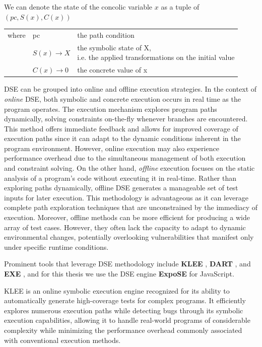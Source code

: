 We can denote the state of the concolic variable $x$ as a tuple of $(pc, S(x), C(x))$


\capstartfalse
{\centering
    \begin{table}[ht]
        \begin{tabular}{lll}
            where & pc & the path condition \\
             & $S(x) \rightarrow X$& \specialcell[c]{the symbolic state of X,\\ i.e. the applied transformations on the initial value}\\
             & $C(x) \rightarrow 0$& the concrete value of x\\
        \end{tabular}
    \end{table}
\par} 
\capstarttrue

DSE can be grouped into online and offline execution strategies. 
In the context of \textit{online} DSE, both symbolic and concrete execution occurs in real time as the program operates. 
The execution mechanism explores program paths dynamically, solving constraints on-the-fly whenever branches are encountered. 
This method offers immediate feedback and allows for improved coverage of execution paths since it can adapt to the dynamic conditions inherent in the program environment. 
However, online execution may also experience performance overhead due to the simultaneous management of both execution and constraint solving. 
On the other hand, \textit{offline} execution focuses on the static analysis of a program’s code without executing it in real-time. 
Rather than exploring paths dynamically, offline DSE generates a manageable set of test inputs for later execution. 
This methodology is advantageous as it can leverage complete path exploration techniques that are unconstrained by the immediacy of execution. 
Moreover, offline methods can be more efficient for producing a wide array of test cases. 
However, they often lack the capacity to adapt to dynamic environmental changes, potentially overlooking vulnerabilities that manifest only under specific runtime conditions. \cite{andreasen_survey_2018}


Prominent tools that leverage DSE methodology include \textbf{KLEE}
\cite{cadar_klee_2008}, \textbf{DART} \cite{godefroid_dart_2005}, and \textbf{EXE} \cite{cadar_exe_2008},
and for this thesis we use the DSE engine \textbf{ExpoSE} \cite{loring_expose_2017} for JavaScript. 

KLEE is an online symbolic execution engine recognized for its ability to automatically generate high-coverage tests for complex programs. It efficiently explores numerous execution paths while detecting bugs through its symbolic execution capabilities, allowing it to handle real-world programs of considerable complexity while minimizing the performance overhead commonly associated with conventional execution methods. 

